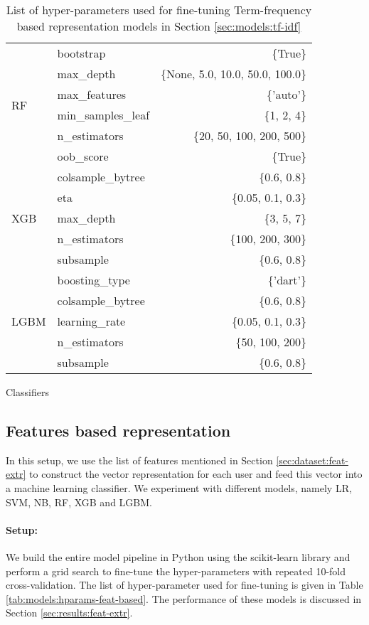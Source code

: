 \begin{table}[htbp]
\begin{subtable}{\textwidth}
\begin{tabular}{llr}
\multirow{6}{*}{RF} & bootstrap & \{True\} \\
 & max\_depth & \{None, 5.0, 10.0, 50.0, 100.0\} \\
 & max\_features & \{'auto'\} \\
 & min\_samples\_leaf & \{1, 2, 4\} \\
 & n\_estimators & \{20, 50, 100, 200, 500\} \\
 & oob\_score & \{True\} \\
\hline
\multirow{5}{*}{XGB} & colsample\_bytree & \{0.6, 0.8\} \\
 & eta & \{0.05, 0.1, 0.3\} \\
 & max\_depth & \{3, 5, 7\} \\
 & n\_estimators & \{100, 200, 300\} \\
 & subsample & \{0.6, 0.8\} \\
\hline
\multirow{5}{*}{LGBM} & boosting\_type & \{'dart'\} \\
 & colsample\_bytree & \{0.6, 0.8\} \\
 & learning\_rate & \{0.05, 0.1, 0.3\} \\
 & n\_estimators & \{50, 100, 200\} \\
 & subsample & \{0.6, 0.8\} \\
\hline
\end{tabular}
\caption{Classifiers}
\end{subtable}
\caption{List of hyper-parameters used for fine-tuning Term-frequency based representation models in Section \ref{sec:models:tf-idf}}
\label{tab:models:hparams-tf-based}
\end{table}

\subsection{Features based representation}
\label{sec:models:feat-based}
In this setup, we use the list of features mentioned in Section \ref{sec:dataset:feat-extr} to construct the vector representation for each user and feed this vector into a machine learning classifier. We experiment with different models, namely \ac{LR}, \ac{SVM}, \ac{NB}, \ac{RF}, \ac{XGB} and \ac{LGBM}. 

\paragraph{Setup:} We build the entire model pipeline in Python using the scikit-learn \cite{scikit-learn} library and perform a grid search to fine-tune the hyper-parameters with repeated 10-fold cross-validation. The list of hyper-parameter used for fine-tuning is given in Table \ref{tab:models:hparams-feat-based}. The performance of these models is discussed in Section \ref{sec:results:feat-extr}.

